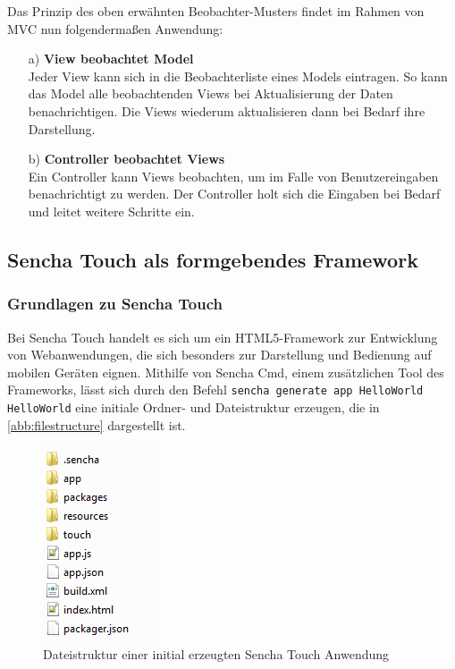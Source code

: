 Das Prinzip des oben erwähnten Beobachter-Musters findet im Rahmen von MVC nun folgendermaßen Anwendung: 
\begin{itemize}
	\item[a)] \textbf{View beobachtet Model}\\
	Jeder View kann sich in die Beobachterliste eines Models eintragen. So kann das Model alle beobachtenden Views bei Aktualisierung der Daten benachrichtigen. Die Views wiederum aktualisieren dann bei Bedarf ihre Darstellung.
	\item[b)] \textbf{Controller beobachtet Views}\\
	Ein Controller kann Views beobachten, um im Falle von Benutzereingaben benachrichtigt zu werden. Der Controller holt sich die Eingaben bei Bedarf und leitet weitere Schritte ein.
\end{itemize}

\subsection{Sencha Touch als formgebendes Framework}
\subsubsection*{Grundlagen zu Sencha Touch}
Bei Sencha Touch handelt es sich um ein HTML5-Framework zur Entwicklung von Webanwendungen, die sich besonders zur Darstellung und Bedienung auf mobilen Geräten eignen. Mithilfe von Sencha Cmd, einem zusätzlichen Tool des Frameworks, lässt sich durch den Befehl \texttt{sencha generate app HelloWorld HelloWorld} eine initiale Ordner- und Dateistruktur erzeugen, die in \vref{abb:filestructure} dargestellt ist.

\begin{figure}[H]
	\centering
	\includegraphics[scale=1]{res/filestructure.png}
	\caption{Dateistruktur einer initial erzeugten Sencha Touch Anwendung\protect\footnotemark}\label{abb:filestructure}
\end{figure}


